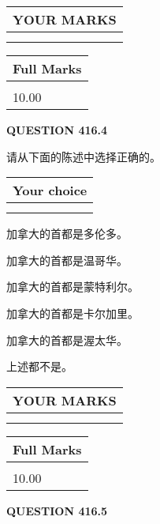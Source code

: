 \documentclass{ctexart}
\begin{document}
 
  
\vspace{0.2in}
  
\noindent\begin{tabular}{|l|}
\hline
 YOUR MARKS  \\
\hline
 \\ 
 \\ 
\hline
\end{tabular}
\hspace{0.05in} \begin{tabular}{|l|}
\hline
 Full Marks  \\
\hline
 \\ 
10.00 \\
\hline
\end{tabular}
{\textbf{\Large{QUESTION
416.4 
}}}
  
  
请从下面的陈述中选择正确的。
  
  
\noindent\hspace{3.0in} \begin{tabular}{|l|}
\hline
Your choice \\
\hline
 \\ 
 \\ 
\hline
\end{tabular}
  
  
 
 
加拿大的首都是多伦多。
 
 
加拿大的首都是温哥华。
 
 
加拿大的首都是蒙特利尔。
 
 
加拿大的首都是卡尔加里。
 
 
加拿大的首都是渥太华。
 
 
 上述都不是。
 
 
  
\vspace{0.2in}
  
\noindent\begin{tabular}{|l|}
\hline
 YOUR MARKS  \\
\hline
 \\ 
 \\ 
\hline
\end{tabular}
\hspace{0.05in} \begin{tabular}{|l|}
\hline
 Full Marks  \\
\hline
 \\ 
10.00 \\
\hline
\end{tabular}
{\textbf{\Large{QUESTION
416.5 
}}}
  
\end{document}
